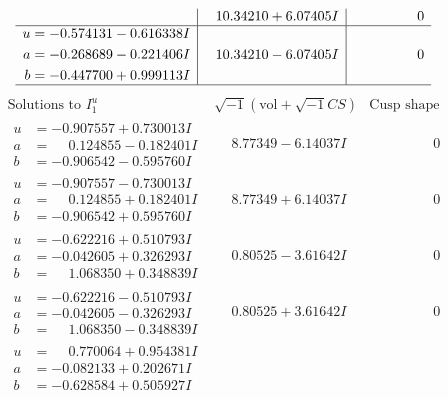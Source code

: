 \documentclass[1p]{elsarticle_modified}
\theoremstyle{definition}
\newcommand{\I}{\sqrt{-1}}
\begin{document}
$$\begin{array}{c|c|c}
 & \phantom{-}10.34210 + 6.07405 I & \phantom{-0.000000 } 0 \\ \hline\begin{aligned}
u &= -0.574131 - 0.616338 I \\
a &= -0.268689 - 0.221406 I \\
b &= -0.447700 + 0.999113 I\end{aligned}
 & \phantom{-}10.34210 - 6.07405 I & \phantom{-0.000000 } 0\\
 \hline 
 \end{array}$$\newpage$$\begin{array}{c|c|c}  
\text{Solutions to }I^u_{1}& \I (\text{vol} + \sqrt{-1}CS) & \text{Cusp shape}\\
 \hline 
\begin{aligned}
u &= -0.907557 + 0.730013 I \\
a &= \phantom{-}0.124855 - 0.182401 I \\
b &= -0.906542 - 0.595760 I\end{aligned}
 & \phantom{-}8.77349 - 6.14037 I & \phantom{-0.000000 } 0 \\ \hline\begin{aligned}
u &= -0.907557 - 0.730013 I \\
a &= \phantom{-}0.124855 + 0.182401 I \\
b &= -0.906542 + 0.595760 I\end{aligned}
 & \phantom{-}8.77349 + 6.14037 I & \phantom{-0.000000 } 0 \\ \hline\begin{aligned}
u &= -0.622216 + 0.510793 I \\
a &= -0.042605 + 0.326293 I \\
b &= \phantom{-}1.068350 + 0.348839 I\end{aligned}
 & \phantom{-}0.80525 - 3.61642 I & \phantom{-0.000000 } 0 \\ \hline\begin{aligned}
u &= -0.622216 - 0.510793 I \\
a &= -0.042605 - 0.326293 I \\
b &= \phantom{-}1.068350 - 0.348839 I\end{aligned}
 & \phantom{-}0.80525 + 3.61642 I & \phantom{-0.000000 } 0 \\ \hline\begin{aligned}
u &= \phantom{-}0.770064 + 0.954381 I \\
a &= -0.082133 + 0.202671 I \\
b &= -0.628584 + 0.505927 I\end{aligned}

\end{array}$$
\end{document}
